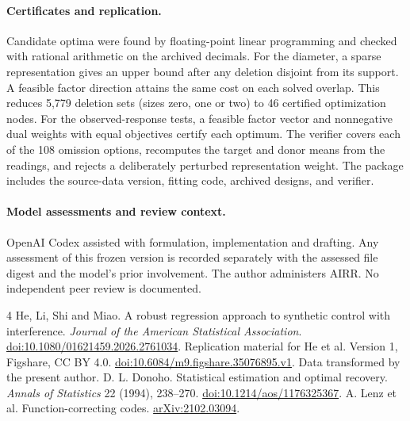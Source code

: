 \documentclass[11pt]{article}
\begin{document}
\paragraph{Certificates and replication.} Candidate optima were found by floating-point linear programming and checked with rational arithmetic on the archived decimals. For the diameter, a sparse representation gives an upper bound after any deletion disjoint from its support. A feasible factor direction attains the same cost on each solved overlap. This reduces 5,779 deletion sets (sizes zero, one or two) to 46 certified optimization nodes. For the observed-response tests, a feasible factor vector and nonnegative dual weights with equal objectives certify each optimum. The verifier covers each of the 108 omission options, recomputes the target and donor means from the readings, and rejects a deliberately perturbed representation weight. The package includes the source-data version, fitting code, archived designs, and verifier.

\paragraph{Model assessments and review context.} OpenAI Codex assisted with formulation, implementation and drafting. Any assessment of this frozen version is recorded separately with the assessed file digest and the model's prior involvement. The author administers AIRR. No independent peer review is documented.

\begin{thebibliography}{4}
 He, Li, Shi and Miao. A robust regression approach to synthetic control with interference. \emph{Journal of the American Statistical Association}. \href{https://doi.org/10.1080/01621459.2026.2761034}{doi:10.1080/01621459.2026.2761034}.
 Replication material for He et al. Version 1, Figshare, CC BY 4.0. \href{https://doi.org/10.6084/m9.figshare.35076895.v1}{doi:10.6084/m9.figshare.35076895.v1}. Data transformed by the present author.
 D. L. Donoho. Statistical estimation and optimal recovery. \emph{Annals of Statistics} 22 (1994), 238--270. \href{https://doi.org/10.1214/aos/1176325367}{doi:10.1214/aos/1176325367}.
 A. Lenz et al. Function-correcting codes. \href{https://arxiv.org/abs/2102.03094}{arXiv:2102.03094}.
\end{thebibliography}
\end{document}
